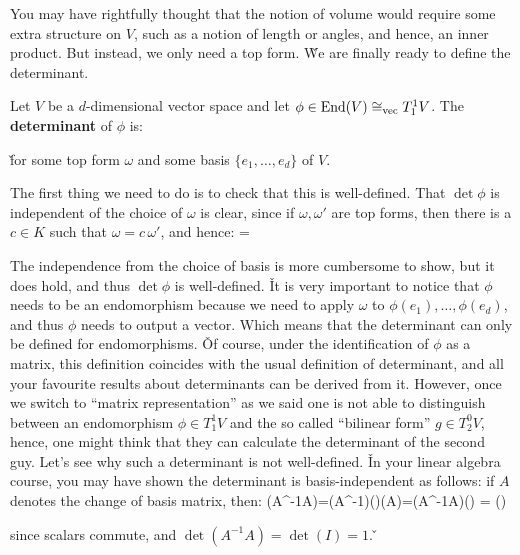 You may have rightfully thought that the notion of volume would require some extra structure on $V$, such as a notion
of length or angles, and hence, an inner product. But instead, we only need a top form. \v

We are finally ready to define the determinant.

\bd [Determinant]
Let $V$ be a $d$-dimensional vector space and let $\phi \in \operatorname{End} (V) \cong_\mathrm{vec}T^1_1 V$. The
\textbf{determinant} of $\phi$ is:
\bse
\det \phi \coloneqq {}
\ese

\v

for some top form $\omega$ and some basis $\{e_1,\ldots,e_d\}$ of $V$.
\ed

The first thing we need to do is to check that this is well-defined. That $\det \phi$ is independent of the choice of
$\omega$ is clear, since if $\omega,\omega'$ are top forms, then there is a $c \in K$ such that $\omega = c\,
\omega'$, and hence:
\bse
{} =
\ese

The independence from the choice of basis is more cumbersome to show, but it does hold, and thus $\det \phi$ is
well-defined. \v

It is very important to notice that $\phi$ needs to be an endomorphism because we need to apply $\omega$ to $\phi
(e_1),\ldots,\phi(e_d)$, and thus $\phi$ needs to output a vector. Which means that the determinant can only be
defined for endomorphisms. \v

Of course, under the identification of $\phi$ as a matrix, this definition coincides with the usual definition of
determinant, and all your favourite results about determinants can be derived from it. However, once we switch to
``matrix representation'' as we said one is not able to distinguish between an endomorphism $\phi \in T^1_1 V$ and
the so called ``bilinear form'' $g\in T^0_2 V$, hence, one might think that they can calculate the determinant of the
second guy. Let's see why such a determinant is not well-defined. \v

In your linear algebra course, you may have shown the determinant is basis-independent as follows: if $A$ denotes the
change of basis matrix, then:
\bse
\det(A^{-1}\phi A)=\det(A^{-1})\det(\phi)\det(A)=\det(A^{-1}A)\det(\phi) = \det(\phi)
\ese

since scalars commute, and $\det(A^{-1}A)=\det(I)=1$. \v

